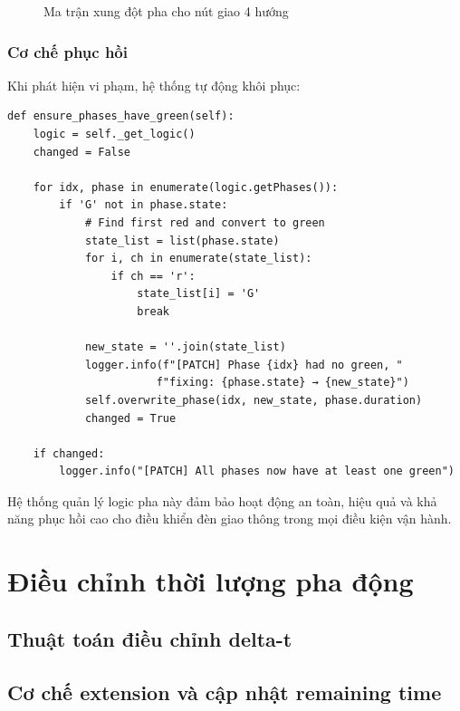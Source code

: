 \begin{figure}[H]
    \centering
    \caption{Ma trận xung đột pha cho nút giao 4 hướng}
    \label{fig:conflict_matrix}
\end{figure}

\subsubsection{Cơ chế phục hồi}

Khi phát hiện vi phạm, hệ thống tự động khôi phục:

\begin{lstlisting}[style=py, caption={Automatic conflict resolution}]
def ensure_phases_have_green(self):
    logic = self._get_logic()
    changed = False
    
    for idx, phase in enumerate(logic.getPhases()):
        if 'G' not in phase.state:
            # Find first red and convert to green
            state_list = list(phase.state)
            for i, ch in enumerate(state_list):
                if ch == 'r':
                    state_list[i] = 'G'
                    break
                    
            new_state = ''.join(state_list)
            logger.info(f"[PATCH] Phase {idx} had no green, "
                       f"fixing: {phase.state} → {new_state}")
            self.overwrite_phase(idx, new_state, phase.duration)
            changed = True
            
    if changed:
        logger.info("[PATCH] All phases now have at least one green")
\end{lstlisting}

Hệ thống quản lý logic pha này đảm bảo hoạt động an toàn, hiệu quả và khả năng phục hồi cao cho điều khiển đèn giao thông trong mọi điều kiện vận hành.
\section{Điều chỉnh thời lượng pha động}
\subsection{Thuật toán điều chỉnh delta-t}
\subsection{Cơ chế extension và cập nhật remaining time}
